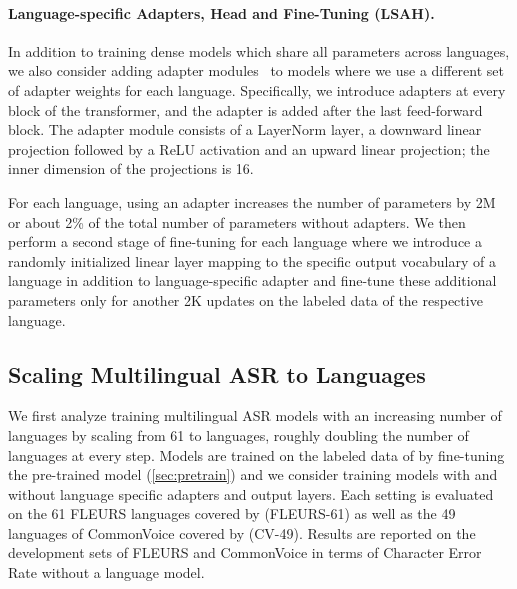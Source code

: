 \paragraph{Language-specific Adapters, Head and Fine-Tuning (LSAH).}
In addition to training dense models which share all parameters across languages, we also consider adding adapter modules~\citep{houlsby2019parameter} to models where we use a different set of adapter weights for each language.
Specifically, we introduce adapters at every block of the transformer, and the adapter is added after the last feed-forward block. The adapter module consists of a LayerNorm \cite{ba2016layer} layer, a downward linear projection followed by a ReLU activation and an upward linear projection; the inner dimension of the projections is 16. 

For each language, using an adapter increases the number of parameters by 2M or about 2\% of the total number of parameters without adapters.
We then perform a second stage of fine-tuning for each language where we introduce a randomly initialized linear layer mapping to the specific output vocabulary of a language in addition to language-specific adapter and fine-tune these additional parameters only for another 2K updates on the labeled data of the respective language.



\subsection{Scaling Multilingual ASR to \nummmslang{} Languages}
\label{sec:asr_scaling}

We first analyze training multilingual ASR models with an increasing number of languages by scaling from 61 to \nummmslang{} languages, roughly doubling the number of languages at every step.
Models are trained on the labeled data of \MMS{} by fine-tuning the  pre-trained model (\textsection\ref{sec:pretrain}) and we consider training models with and without language specific adapters and output layers.
Each setting is evaluated on the 61 FLEURS languages covered by \MMS{} (FLEURS-61) as well as the 49 languages of CommonVoice covered by \MMS{} (CV-49). 
Results are reported on the development sets of FLEURS and CommonVoice in terms of Character Error Rate without a language model.

